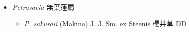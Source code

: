 
  \begin{itemize}
 \item[] \textit{Petrosavia} 無葉蓮屬
                                
  \begin{itemize}
        \item[] \textit{P. sakuraii} (Makino) J. J. Sm. ex Steenis  櫻井草   DD
  \end{itemize}
  \end{itemize}

